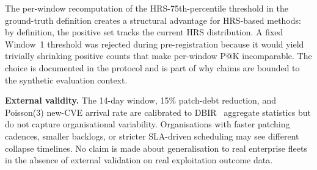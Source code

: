 The per-window recomputation of the HRS-75th-percentile threshold in the ground-truth definition creates a structural advantage for HRS-based methods: by definition, the positive set tracks the current HRS distribution. A fixed Window~1 threshold was rejected during pre-registration because it would yield trivially shrinking positive counts that make per-window P@K incomparable. The choice is documented in the protocol and is part of why claims are bounded to the synthetic evaluation context.

\textbf{External validity.} The 14-day window, 15\% patch-debt reduction, and Poisson(3) new-CVE arrival rate are calibrated to DBIR~\cite{verizon2026dbir} aggregate statistics but do not capture organisational variability. Organisations with faster patching cadences, smaller backlogs, or stricter SLA-driven scheduling may see different collapse timelines. No claim is made about generalisation to real enterprise fleets in the absence of external validation on real exploitation outcome data.
